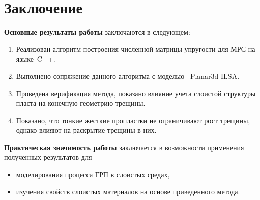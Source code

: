 \chapter*{Заключение}                       %
\label{ch:conclusion} 

\textbf{Основные результаты работы} заключаются в следующем:
\begin{enumerate}
    \item Реализован алгоритм построения численной матрицы упругости для МРС на языке~C++.
    \item Выполнено сопряжение данного алгоритма с моделью  Planar3d ILSA.
    \item Проведена верификация метода, показано влияние учета слоистой структуры пласта на конечную геометрию трещины.
    \item Показано, что тонкие жесткие пропластки не ограничивают рост трещины, однако влияют на раскрытие трещины в них.
\end{enumerate}

\textbf{Практическая значимость работы} заключается в возможности применения полученных результатов для
\begin{itemize}
    \item моделирования процесса ГРП в слоистых средах,
    \item изучения свойств слоистых материалов на основе приведенного метода.
\end{itemize}
